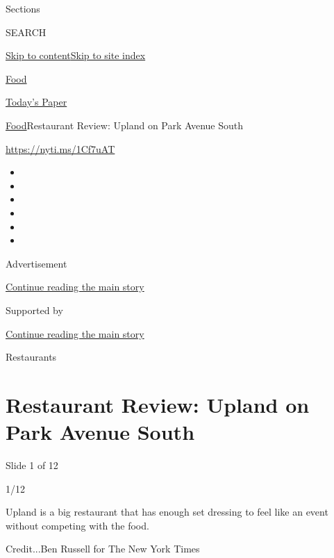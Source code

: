 Sections

SEARCH

\protect\hyperlink{site-content}{Skip to
content}\protect\hyperlink{site-index}{Skip to site index}

\href{https://www.nytimes3xbfgragh.onion/section/food}{Food}

\href{https://myaccount.nytimes3xbfgragh.onion/auth/login?response_type=cookie\&client_id=vi}{}

\href{https://www.nytimes3xbfgragh.onion/section/todayspaper}{Today's
Paper}

\href{/section/food}{Food}\textbar{}Restaurant Review: Upland on Park
Avenue South

\url{https://nyti.ms/1Cf7uAT}

\begin{itemize}
\item
\item
\item
\item
\item
\item
\end{itemize}

Advertisement

\protect\hyperlink{after-top}{Continue reading the main story}

Supported by

\protect\hyperlink{after-sponsor}{Continue reading the main story}

Restaurants

\hypertarget{restaurant-review-upland-on-park-avenue-south}{%
\section{Restaurant Review: Upland on Park Avenue
South}\label{restaurant-review-upland-on-park-avenue-south}}

Slide 1 of 12

1/12

Upland is a big restaurant that has enough set dressing to feel like an
event without competing with the food.

Credit...Ben Russell for The New York Times

